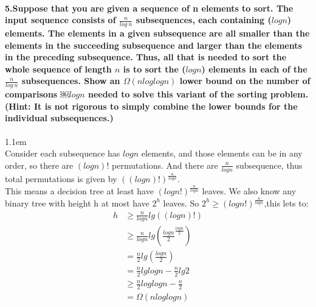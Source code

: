 \documentclass[11pt]{article}
\begin{document}
\paragraph{5.Suppose that you are given a sequence of n elements to sort. The input sequence consists of $\frac{n}{log\ n}$ subsequences, each containing ($log n$) elements. The elements in a given subsequence are all 
smaller than the elements in the succeeding subsequence and larger than the elements in the preceding
subsequence. Thus, all that is needed to sort the whole sequence of length $n$ is to sort the ($log n$) elements in each of the $\frac{n}{log\ n}$ subsequences. Show an $\Omega (nloglogn)$ lower bound on the number of comparisons
￼$logn$
needed to solve this variant of the sorting problem. (Hint: It is not rigorous to simply combine the
lower bounds for the individual subsequences.)}
\hangindent 1.1em
\noindent
\\Consider each subsequence has $logn$ elements, and those elements can be in any order, so there are $(logn)!$ permutations. And there are $\frac{n}{logn}$ subsequence, thus total permutations is given by $((logn)!)^{\frac{n}{logn}}$.
\\This means a decision tree at least have $(logn!)^{\frac{n}{logn}}$ leaves. We also know any binary tree with height h at most have $2^{h}$ leaves. So $2^{h}\geq (logn!)^{\frac{n}{logn}}$,this lets to:
\begin{align}
h&\geq\frac{n}{logn}lg((logn)!)\\
 &\geq\frac{n}{logn}lg(\frac{logn}{2}^{\frac{logn}{2}})\\
 &=\frac{n}{2}lg(\frac{logn}{2})\\
 &=\frac{n}{2}lglogn-\frac{n}{2}lg2\\
 &\geq\frac{n}{2}loglogn-\frac{n}{2}\\
 &=\Omega(nloglogn)
\end{align}
\end{document}
